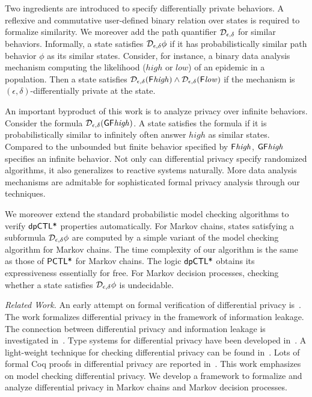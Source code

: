 
Two ingredients are introduced to specify differentially private
behaviors. A reflexive and commutative user-defined binary relation
over states is required to formalize similarity. We moreover add
the path quantifier $\mathcal{D}_{{\epsilon}, {\delta}}$ for similar
behaviors. Informally, a state satisfies $\mathcal{D}_{{\epsilon}, {\delta}}
\phi$ if it has probabilistically similar path behavior $\phi$ as
its similar states. Consider, for instance, a binary data analysis
mechanism computing the likelihood ($\mathit{high}$ or $\mathit{low}$)
of an epidemic in a population. Then a state satisfies
$\mathcal{D}_{{\epsilon}, {\delta}} (\mathsf{F} \mathit{high}) \wedge
\mathcal{D}_{{\epsilon}, {\delta}} (\mathsf{F} \mathit{low})$ if the mechanism is
$(\epsilon, \delta)$-differentially private at the state.


An important byproduct of this work is to analyze privacy over
infinite behaviors. Consider the formula $\mathcal{D}_{{\epsilon}, {\delta}}
(\mathsf{G} \mathsf{F} \mathit{high})$. A state satisfies the formula if it
is probabilistically similar to  infinitely often
answer $\mathit{high}$ as similar states. Compared to the unbounded
but finite behavior specified by $\mathsf{F} \mathit{high}$,
$\mathsf{G} \mathsf{F} \mathit{high}$ specifies an infinite behavior.
Not only can differential privacy specify randomized algorithms, it
also generalizes to reactive systems naturally.
More data analysis mechanisms are admitable for sophisticated formal
privacy analysis through our techniques.


We moreover extend the standard probabilistic model checking
algorithms to verify $\textsf{dpCTL*}$ properties automatically. For Markov
chains, states
satisfying a subformula $\mathcal{D}_{{\epsilon}, {\delta}} \phi$ are computed
by a simple variant of the model checking algorithm for Markov chains.
The time complexity of our algorithm is the same as
those of $\textsf{PCTL*}$ for Markov chains. The logic $\textsf{dpCTL*}$ obtains its
expressiveness essentially for free.
For Markov decision processes, checking whether a state
satisfies $\mathcal{D}_{{\epsilon}, {\delta}} \phi$ is undecidable.


\noindent
\emph{Related Work.}
An early attempt on formal verification of differential privacy
is~\cite{TKD:11:FVDPIS}. The work formalizes differential privacy in
the framework of information leakage. The connection between
differential privacy and information leakage is investigated
in~\cite{AACDP:15:OILDPM,GMP:16:PDPFPS}. Type systems for differential
privacy have been developed
in~\cite{WHRP:17:FADP,GHHNP:13:LDPDP,RP:10:DMTGS}. A light-weight
technique for checking differential privacy can be found
in~\cite{ZK:17:LTADPP}. Lots of formal Coq proofs in differential
privacy are reported
in~\cite{BFGGHS:16:APCDP,BGGHS:16:PDPPC,BKOB:12:PRRDP,BDGKZ:13:VCDPASM,BGAHKS:14:PDPHL,BGAHRS:15:HOARRT,BFGAGHS:16:DPBP}. This
work emphasizes on model checking differential privacy. We develop a
framework to formalize and analyze differential privacy in Markov
chains and Markov decision processes.

